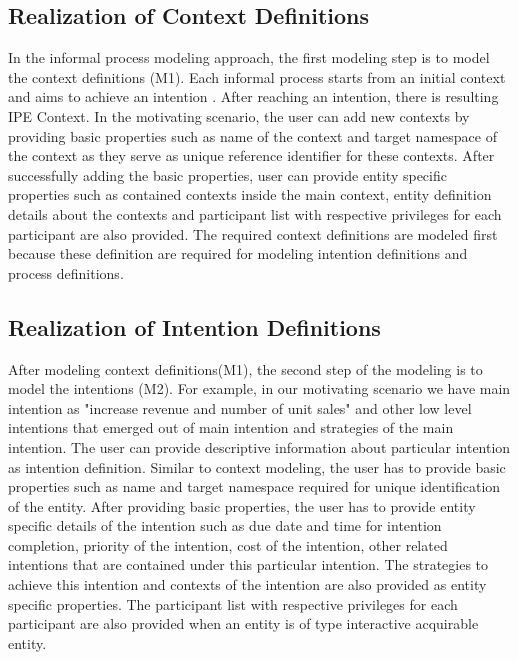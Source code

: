 \subsection{Realization of Context Definitions}
In the informal process modeling approach, the first modeling step is to model the context definitions (M1). Each informal process starts from an initial context and aims to achieve an intention \cite{Sungur2014a}. After reaching an intention, there is resulting IPE Context. In the motivating scenario, the user can add new contexts by providing basic properties such as name of the context and target namespace of the context as they serve as unique reference identifier for these contexts. After successfully adding the basic properties, user can provide entity specific properties such as contained contexts inside the main context, entity definition details about the contexts and participant list with respective privileges for each participant are also provided. The required context definitions are modeled first because these definition are required for modeling intention definitions and process definitions.  

\subsection{Realization of Intention Definitions}
After modeling context definitions(M1), the second step of the modeling is to model the intentions (M2). For example, in our motivating scenario we have main intention as "increase revenue and number of unit sales" and other low level intentions that emerged out of main intention and strategies of the main intention. The user can provide descriptive information about particular intention as intention definition. Similar to context modeling, the user has to provide basic properties such as name and target namespace required for unique identification of the entity. After providing basic properties, the user has to provide entity specific details of the intention such as due date and time for intention completion, priority of the intention, cost of the intention, other related intentions that are contained under this particular intention. The strategies to achieve this intention and contexts of the intention are also provided as entity specific properties. The participant list with respective privileges for each participant are also provided when an entity is of type interactive acquirable entity. 

